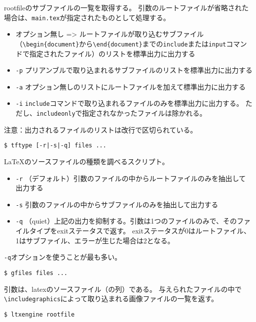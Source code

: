 rootfileのサブファイルの一覧を取得する。
引数のルートファイルが省略された場合は、\texttt{main.tex}が指定されたものとして処理する。

\begin{itemize}
\tightlist
\item
  オプション無し =\textgreater{}
  ルートファイルが取り込むサブファイル（\texttt{\textbackslash{}begin\{document\}}から\texttt{\textbackslash{}end\{document\}}までの\texttt{include}または\texttt{input}コマンドで指定されたファイル）のリストを標準出力に出力する
\item
  \texttt{-p}
  プリアンブルで取り込まれるサブファイルのリストを標準出力に出力する
\item
  \texttt{-a}
  オプション無しのリストにルートファイルを加えて標準出力に出力する
\item
  \texttt{-i}
  \texttt{include}コマンドで取り込まれるファイルのみを標準出力に出力する。
  ただし、\texttt{includeonly}で指定されなかったファイルは除かれる。
\end{itemize}

注意：出力されるファイルのリストは改行で区切られている。

\begin{verbatim}
$ tftype [-r|-s|-q] files ...
\end{verbatim}

LaTeXのソースファイルの種類を調べるスクリプト。

\begin{itemize}
\tightlist
\item
  \texttt{-r}
  （デフォルト）引数のファイルの中からルートファイルのみを抽出して出力する
\item
  \texttt{-s} 引数のファイルの中からサブファイルのみを抽出して出力する
\item
  \texttt{-q}
  （quiet）上記の出力を抑制する。引数は1つのファイルのみで、そのファイルタイプをexitステータスで返す。
  exitステータスが0はルートファイル、1はサブファイル、エラーが生じた場合は2となる。
\end{itemize}

\texttt{-q}オプションを使うことが最も多い。

\begin{verbatim}
$ gfiles files ...
\end{verbatim}

引数は、latexのソースファイル（の列）である。
与えられたファイルの中で\texttt{\textbackslash{}includegraphics}によって取り込まれる画像ファイルの一覧を返す。

\begin{verbatim}
$ ltxengine rootfile
\end{verbatim}

